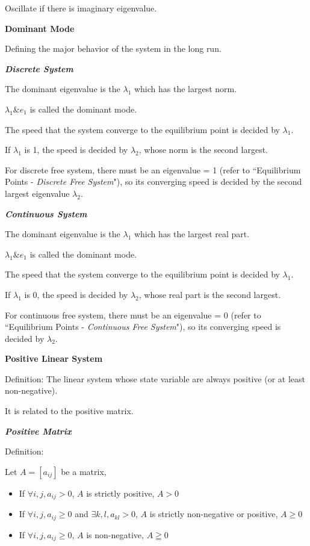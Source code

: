 \documentclass{article}
\newcommand{\bigtitle}[1]{
	\noindent
	\textbf{#1}
}
\newcommand{\smalltitle}[1]{
	\noindent
	\textbf{\textit{#1}}
}
\begin{document}
\begin{spacing}{1.2}
Oscillate if there is imaginary eigenvalue.


\bigtitle{Dominant Mode}

Defining the major behavior of the system in the long run.

\smalltitle{Discrete System}

The dominant eigenvalue is the $\lambda_1$ which has the largest norm.

$\lambda_{1} \& e_1$ is called the dominant mode.

The speed that the system converge to the equilibrium point is decided by $\lambda_1$.

If $\lambda_{1}$ is 1, the speed is decided by $\lambda_{2}$, whose norm is the second largest.

For discrete free system, there must be an eigenvalue = 1 (refer to ``Equilibrium Points - \textit{Discrete Free System}"), so its converging speed is decided by the second largest eigenvalue $\lambda_{2}$.

\smalltitle{Continuous System}

The dominant eigenvalue is the $\lambda_{1}$ which has the largest real part.

$\lambda_{1} \& e_1$ is called the dominant mode.

The speed that the system converge to the equilibrium point is decided by $\lambda_1$.

If $\lambda_{1}$ is 0, the speed is decided by $\lambda_{2}$, whose real part is the second largest.

For continuous free system, there must be an eigenvalue = 0 (refer to ``Equilibrium Points - \textit{Continuous Free System}"), so its converging speed is decided by $\lambda_{2}$.


\bigtitle{Positive Linear System}

Definition: The linear system whose state variable are always positive (or at least non-negative).

It is related to the positive matrix.

\smalltitle{Positive Matrix}

Definition:

Let $A = [a_{ij}]$ be a matrix,

\begin{itemize}
	\item If $\forall i,j, a_{ij} > 0$, $A$ is strictly positive, $A>0$
	\item If $\forall i,j, a_{ij} \geq 0$ and $\exists k,l, a_{kl} > 0$, $A$ is strictly non-negative or positive, $A\geq 0$
	\item If $\forall i,j, a_{ij} \geq 0$, $A$ is non-negative, $A \geqq 0$
\end{itemize}


\end{spacing}
\end{document}
